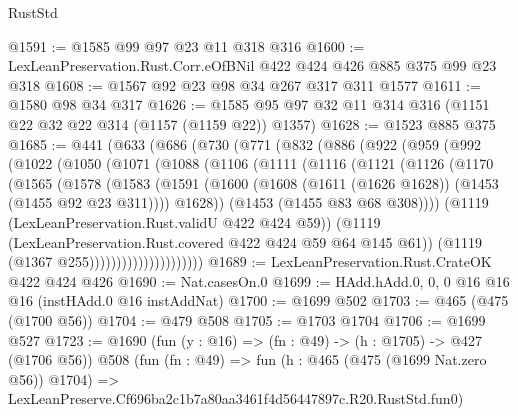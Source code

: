 \begin{lexlean}{RustStd}
\begin{coremodule}
@1591 := @1585 @99 @97 @23 @11 @318 @316
@1600 := LexLeanPreservation.Rust.Corr.eOfBNil @422 @424 @426 @885 @375 @99 @23 @318
@1608 := @1567 @92 @23 @98 @34 @267 @317 @311 @1577
@1611 := @1580 @98 @34 @317
@1626 := @1585 @95 @97 @32 @11 @314 @316 (@1151 @22 @32 @22 @314 (@1157 (@1159 @22)) @1357)
@1628 := @1523 @885 @375
@1685 := @441
    (@633
      (@686
        (@730
          (@771
            (@832
              (@886
                (@922
                  (@959
                    (@992
                      (@1022
                        (@1050
                          (@1071
                            (@1088
                              (@1106
                                (@1111
                                  (@1116
                                    (@1121
                                      (@1126
                                        (@1170
                                          (@1565
                                            (@1578
                                              (@1583
                                                (@1591
                                                  (@1600
                                                    (@1608
                                                      (@1611 (@1626 @1628))
                                                      (@1453 (@1455 @92 @23 @311))))
                                                  @1628))
                                              (@1453 (@1455 @83 @68 @308))))
                                          (@1119 (LexLeanPreservation.Rust.validU @422 @424 @59))
                                          (@1119
                                            (LexLeanPreservation.Rust.covered
                                              @422
                                              @424
                                              @59
                                              @64
                                              @145
                                              @61))
                                          (@1119 (@1367 @255)))))))))))))))))))))
@1689 := LexLeanPreservation.Rust.CrateOK @422 @424 @426
@1690 := Nat.casesOn.{0}
@1699 := HAdd.hAdd.{0, 0, 0} @16 @16 @16 (instHAdd.{0} @16 instAddNat)
@1700 := @1699 @502
@1703 := @465 (@475 (@1700 @56))
@1704 := @479 @508
@1705 := @1703 @1704
@1706 := @1699 @527
@1723 := @1690
    (fun (y : @16) => (fn : @49) -> (h : @1705) -> @427 (@1706 @56))
    @508
    (fun (fn : @49) =>
    fun (h : @465 (@475 (@1699 Nat.zero @56)) @1704) =>
    LexLeanPreserve.Cf696ba2c1b7a80aa3461f4d56447897c.R20.RustStd.fun0)

\end{coremodule}
\end{lexlean}
